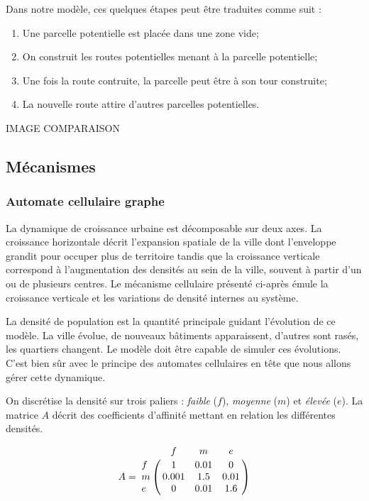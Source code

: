 \documentclass[12pt]{article}
\begin{document}
Dans notre modèle, ces quelques étapes peut être traduites comme suit
:

\begin{enumerate}
\item{Une parcelle potentielle est placée dans une zone vide;}
\item{On construit les routes potentielles menant à la parcelle potentielle;}
\item{Une fois la route contruite, la parcelle peut être à son tour construite;}
\item{La nouvelle route attire d'autres parcelles potentielles.}
\end{enumerate}

IMAGE COMPARAISON

\subsection{Mécanismes}

\subsubsection{Automate cellulaire graphe}

La dynamique de croissance urbaine est décomposable sur deux axes. La
croissance horizontale décrit l'expansion spatiale de la ville dont
l'enveloppe grandit pour occuper plus de territoire tandis que la
croissance verticale correspond à l'augmentation des densités au sein
de la ville, souvent à partir d'un ou de plusieurs centres. Le
mécanisme cellulaire présenté ci-après émule la croissance verticale
et les variations de densité internes au système.

La densité de population est la quantité principale guidant
l'évolution de ce modèle. La ville évolue, de nouveaux bâtiments
apparaissent, d'autres sont rasés, les quartiers changent. Le modèle
doit être capable de simuler ces évolutions. C'est bien sûr avec le
principe des automates cellulaires en tête que nous allons gérer cette
dynamique.

On discrétise la densité sur trois paliers : \textit{faible} ($f$),
\textit{moyenne} ($m$) et \textit{élevée} ($e$). La matrice $A$ décrit
des coefficients d'affinité mettant en relation les différentes
densités.

\begin{equation}
A =
\bordermatrix{
    & f & m & e \cr
  f & 1 & 0.01 & 0 \cr
  m & 0.001 & 1.5 & 0.01 \cr
  e & 0 & 0.01 & 1.6
}
\end{equation}
\end{document}
